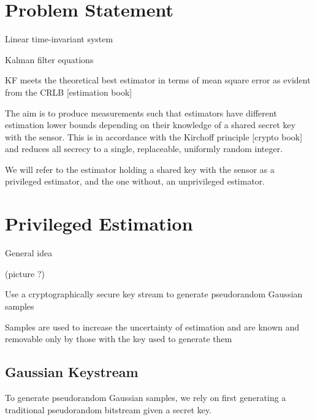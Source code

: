 \documentclass[conference]{IEEEtran}
\theoremstyle{definition}
\theoremstyle{definition}
\theoremstyle{remark}
\begin{document}
\section{Problem Statement}
Linear time-invariant system

Kalman filter equations 

KF meets the theoretical best estimator in terms of mean square error as evident from the CRLB [estimation book]

The aim is to produce measurements such that estimators have different estimation lower bounds depending on their knowledge of a shared secret key with the sensor. This is in accordance with the Kirchoff principle [crypto book] and reduces all secrecy to a single, replaceable, uniformly random integer.

We will refer to the estimator holding a shared key with the sensor as a privileged estimator, and the one without, an unprivileged estimator.


% 
%                                                                                
%                                                                                
%                                                                                
% 

\section{Privileged Estimation}
General idea

(picture ?)

Use a cryptographically secure key stream to generate pseudorandom Gaussian samples

Samples are used to increase the uncertainty of estimation and are known and removable only by those with the key used to generate them

\subsection{Gaussian Keystream}
To generate pseudorandom Gaussian samples, we rely on first generating a traditional pseudorandom bitstream given a secret key.
\end{document}
